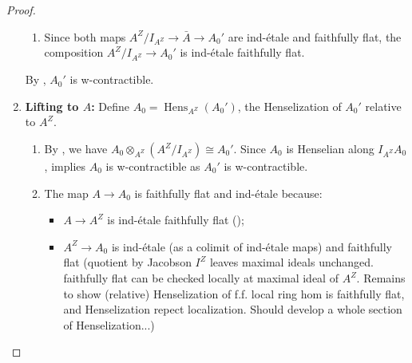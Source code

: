 \begin{proof}
\begin{enumerate}
\begin{enumerate}
            \item Since both maps \(A^Z/I_{A^Z} \to \bar{A} \to A_0'\) are ind-étale and faithfully flat, the composition $A^Z/I_{A^Z} \to A_0'$ is ind-étale faithfully flat.
        \end{enumerate}
        
        By , $A_0'$ is w-contractible.

        \item \textbf{Lifting to $A$:} 
        Define $A_0 = \operatorname{Hens}_{A^Z}(A_0')$, the Henselization of $A_0'$ relative to $A^Z$.
        
        \begin{enumerate}
            \item By , we have $A_0 \otimes_{A^Z} (A^Z/I_{A^Z}) \cong A_0'$. Since $A_0$ is Henselian along $I_{A^Z}A_0$,  implies $A_0$ is w-contractible as $A_0'$ is w-contractible.

            \item The map $A \to A_0$ is faithfully flat and ind-étale because:
            \begin{itemize}
                \item $A \to A^Z$ is ind-étale faithfully flat ();
                \item $A^Z \to A_0$ is ind-étale (as a colimit of ind-étale maps) and faithfully flat {\red(quotient by Jacobson \(I^Z\) leaves maximal ideals unchanged. faithfully flat can be checked locally at maximal ideal of \(A^Z\). Remains to show (relative) Henselization of f.f. local ring hom is faithfully flat, and Henselization repect localization. Should develop a whole section of Henselization...)}
            \end{itemize}
        \end{enumerate}
    \end{enumerate}

\end{proof}

